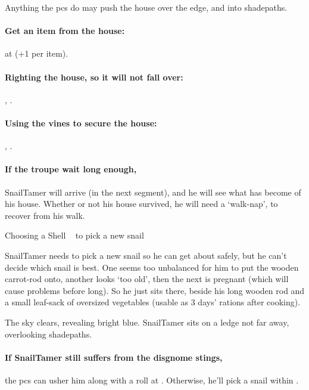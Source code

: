 Anything the \glspl{pc} do may push the house over the edge, and into \gls{shadepaths}.

\paragraph{Get an item from the house:}
 at \tn[12] (+1 per item).

\paragraph{Righting the house, so it will not fall over:}
, \tn[12].

\paragraph{Using the vines to secure the house:}
, \tn[10].

\paragraph{If the troupe wait long enough,}
\gls{SnailTamer} will arrive (in the next \gls{segment}), and he will see what has become of his house.
Whether or not his house survived, he will need a `walk-nap', to recover from his walk.

{Choosing a Shell}%
{~ to pick a new snail}%

\Gls{SnailTamer} needs to pick a new snail so he can get about safely, but he can't decide which snail is best.
One seems too unbalanced for him to put the wooden carrot-rod onto, another looks `too old', then the next is pregnant (which will cause problems before long).
So he just sits there, beside his long wooden rod and a small leaf-sack of oversized vegetables (usable as 3 days' \glspl{ration} after cooking).

\begin{boxtext}
  The sky clears, revealing bright blue.
  \Gls{SnailTamer} sits on a ledge not far away, overlooking \gls{shadepaths}.
\end{boxtext}

\paragraph{If \gls{SnailTamer} still suffers from the \gls{disgnome} stings,}
the \glspl{pc} can usher him along with a  roll at \tn[10].
Otherwise, he'll pick a snail within .

